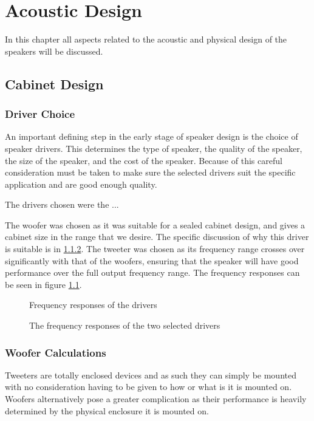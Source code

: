 \documentclass[main.tex]{subfiles}
\begin{document}
\chapter{Acoustic Design}
In this chapter all aspects related to the acoustic and physical design of the speakers will be discussed.
\section{Cabinet Design}
\subsection{Driver Choice}
An important defining step in the early stage of speaker design is the choice of speaker drivers. 
This determines the type of speaker, the quality of the speaker, the size of the speaker, and the cost of the speaker.
Because of this careful consideration must be taken to make sure the selected drivers suit the specific application and are good enough quality.

The drivers chosen were the ...

The woofer was chosen as it was suitable for a sealed cabinet design, and gives a cabinet size in the range that we desire.
The specific discussion of why this driver is suitable is in \ref{woofercalcs}.
The tweeter was chosen as its frequency range crosses over significantly with that of the woofers, ensuring that the speaker will have good performance over the full output frequency range.
The frequency responses can be seen in figure \ref{fig:driverFreqResponse}.
\begin{figure}
    \centering
    Frequency responses of the drivers
    \caption{The frequency responses of the two selected drivers}
    \label{fig:driverFreqResponse}
\end{figure}

\subsection{Woofer Calculations}
\label{woofercalcs}
Tweeters are totally enclosed devices and as such they can simply be mounted with no consideration having to be given to how or what is it is mounted on.
Woofers alternatively pose a greater complication as their performance is heavily determined by the physical enclosure it is mounted on.
\end{document}
